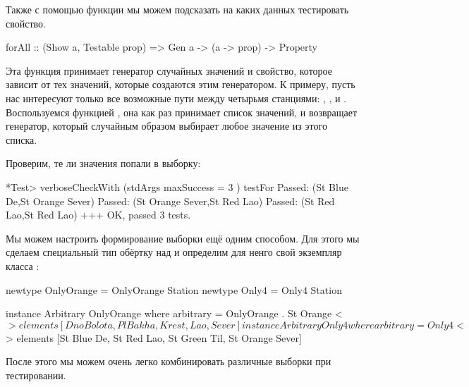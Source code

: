 Также с помощью функции  мы можем подсказать 
на каких данных тестировать свойство.


\begin{code}
forAll :: (Show a, Testable prop) => Gen a -> (a -> prop) -> Property
\end{code}

Эта функция принимает генератор случайных значений и свойство, которое
зависит от тех значений, которые создаются этим генератором. К примеру,
пусть нас интересуют только все возможные пути между четырьмя станциями:
, ,  и
. Воспользуемся функцией
, она как раз принимает список значений, и
возвращает генератор, который случайным образом выбирает любое значение
из этого списка.



Проверим, те ли значения попали в выборку:


\begin{code}
*Test> verboseCheckWith (stdArgs{ maxSuccess = 3 }) testFor
Passed:  
(St Blue De,St Orange Sever)
Passed: 
(St Orange Sever,St Red Lao)
Passed:  
(St Red Lao,St Red Lao)
+++ OK, passed 3 tests.
\end{code}

Мы можем настроить формирование выборки ещё одним способом. Для этого мы
сделаем специальный тип обёртку над  и определим для ненго
свой экземпляр класса :


\begin{code}
newtype OnlyOrange = OnlyOrange Station
newtype Only4      = Only4       Station

instance Arbitrary OnlyOrange where
    arbitrary = OnlyOrange . St Orange <$> 
        elements [DnoBolota, PlBakha, Krest, Lao, Sever]

instance Arbitrary Only4 where
    arbitrary = Only4 <$> elements [St Blue De, St Red Lao, 
                    St Green Til, St Orange Sever]
\end{code}

После этого мы можем очень легко комбинировать различные выборки при
тестировании.




